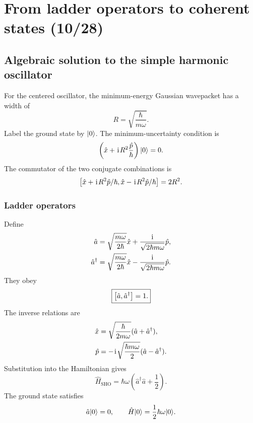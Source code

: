 \section{From ladder operators to coherent states (10/28)}


\subsection{Algebraic solution to the simple harmonic oscillator}

For the centered oscillator, the minimum-energy Gaussian wavepacket has a width of 
\begin{equation}
 R=\sqrt{\frac{\hbar}{m\omega}}.
\end{equation}
Label the ground state by $|{0}\rangle$. The minimum-uncertainty condition is
\begin{equation}
 \left(\hat x+\hspace{1pt}\mathrm{i}\hspace{1pt} R^2\frac{\hat p}{\hbar}\right)|{0}\rangle=0.
\end{equation}
The commutator of the two conjugate combinations is
\begin{equation}
 \left[\hat x+\hspace{1pt}\mathrm{i}\hspace{1pt} R^2\hat p/\hbar,\hat x-\hspace{1pt}\mathrm{i}\hspace{1pt} R^2\hat p/\hbar\right]=2R^2.
\end{equation}

\subsubsection{Ladder operators}
Define
\begin{align}
 \hat a
 &=\sqrt{\frac{m\omega}{2\hbar}}\hat x
 +\frac{\hspace{1pt}\mathrm{i}\hspace{1pt}}{\sqrt{2\hbar m\omega}}\hat p,\\
 \hat a^\dagger
 &=\sqrt{\frac{m\omega}{2\hbar}}\hat x
 -\frac{\hspace{1pt}\mathrm{i}\hspace{1pt}}{\sqrt{2\hbar m\omega}}\hat p.
\end{align}
They obey
\begin{equation}
 \boxed{\left[\hat a,\hat a^\dagger\right]=1.}
\end{equation}
The inverse relations are
\begin{align}
 \hat x&=\sqrt{\frac{\hbar}{2m\omega}}
 (\hat a+\hat a^\dagger),\\
 \hat p&=-\hspace{1pt}\mathrm{i}\hspace{1pt}\sqrt{\frac{\hbar m\omega}{2}}
 (\hat a-\hat a^\dagger).
\end{align}
Substitution into the Hamiltonian gives
\begin{equation}
 \boxed{\hat H_{\text{SHO}}=\hbar\omega
 \left(\hat a^\dagger\hat a+\frac12\right).}
\end{equation}
The ground state satisfies
\begin{equation}
 \hat a|{0}\rangle=0,
 \qquad
 \hat H|{0}\rangle=\frac12\hbar\omega|{0}\rangle.
\end{equation}

